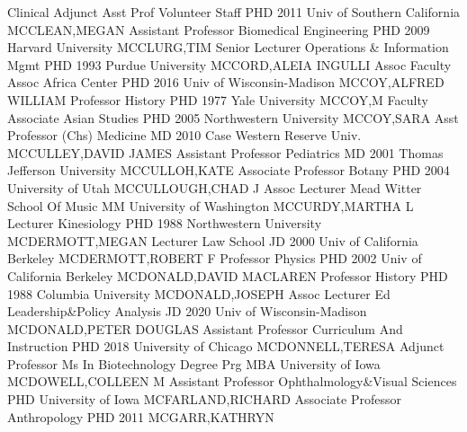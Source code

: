 \documentclass[
]{article}
\begin{document}
\textbar Clinical Adjunct Asst Prof \textbar Volunteer Staff
\textbar PHD 2011 Univ of Southern California \textbar MCCLEAN,MEGAN
\textbar{}  \textbar Assistant Professor \textbar Biomedical
Engineering \textbar PHD 2009 Harvard University \textbar MCCLURG,TIM
\textbar{}  \textbar Senior Lecturer \textbar Operations \&
Information Mgmt \textbar PHD 1993 Purdue University
\textbar MCCORD,ALEIA INGULLI \textbar{}  \textbar Assoc
Faculty Assoc \textbar Africa Center \textbar PHD 2016 Univ of
Wisconsin-Madison \textbar MCCOY,ALFRED WILLIAM \textbar{} 
\textbar Professor \textbar History \textbar PHD 1977 Yale University
\textbar MCCOY,M \textbar{}  \textbar Faculty Associate
\textbar Asian Studies \textbar PHD 2005 Northwestern University
\textbar MCCOY,SARA \textbar{}  \textbar Asst Professor
(Chs) \textbar Medicine \textbar MD 2010 Case Western Reserve Univ.
\textbar MCCULLEY,DAVID JAMES \textbar{}  \textbar Assistant
Professor \textbar Pediatrics \textbar MD 2001 Thomas Jefferson
University \textbar MCCULLOH,KATE \textbar{} 
\textbar Associate Professor \textbar Botany \textbar PHD 2004
University of Utah \textbar MCCULLOUGH,CHAD J \textbar{} 
\textbar Assoc Lecturer \textbar Mead Witter School Of Music \textbar MM
University of Washington \textbar MCCURDY,MARTHA L \textbar{}
 \textbar Lecturer \textbar Kinesiology \textbar PHD 1988
Northwestern University \textbar MCDERMOTT,MEGAN \textbar{} 
\textbar Lecturer \textbar Law School \textbar JD 2000 Univ of
California Berkeley \textbar MCDERMOTT,ROBERT F \textbar{} 
\textbar Professor \textbar Physics \textbar PHD 2002 Univ of California
Berkeley \textbar MCDONALD,DAVID MACLAREN \textbar{} 
\textbar Professor \textbar History \textbar PHD 1988 Columbia
University \textbar MCDONALD,JOSEPH \textbar{} 
\textbar Assoc Lecturer \textbar Ed Leadership\&Policy Analysis
\textbar JD 2020 Univ of Wisconsin-Madison \textbar MCDONALD,PETER
DOUGLAS \textbar{}  \textbar Assistant Professor
\textbar Curriculum And Instruction \textbar PHD 2018 University of
Chicago \textbar MCDONNELL,TERESA \textbar{} 
\textbar Adjunct Professor \textbar Ms In Biotechnology Degree Prg
\textbar MBA University of Iowa \textbar MCDOWELL,COLLEEN M \textbar{}
 \textbar Assistant Professor \textbar Ophthalmology\&Visual
Sciences \textbar PHD University of Iowa \textbar MCFARLAND,RICHARD
\textbar{}  \textbar Associate Professor
\textbar Anthropology \textbar PHD 2011 \textbar MCGARR,KATHRYN
\end{document}
